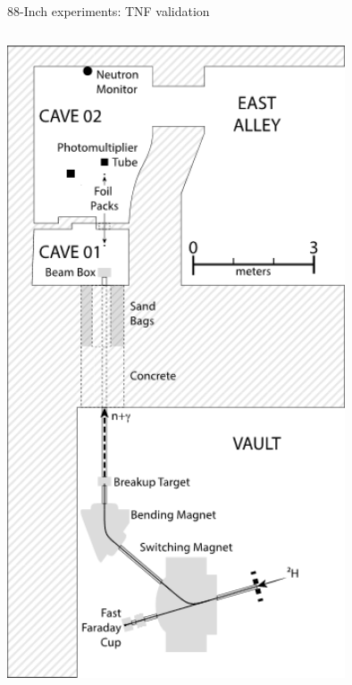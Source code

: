\documentclass[xcolor=x11names,compress]{beamer}
\renewcommand{\(}{\begin{columns}}
\renewcommand{\)}{\end{columns}}
\newcommand{\<}[1]{\begin{column}{#1}}
\renewcommand{\>}{\end{column}}
\begin{document}
\begin{frame}{88-Inch experiments: TNF validation}
\begin{columns}
        \begin{column}{0.45\linewidth}
          \includegraphics[width=0.75\textwidth]{../figs/88InchLayout.png}
        \end{column}
      \end{columns}
\end{frame}
\end{document}

